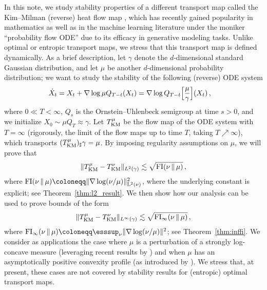 \documentclass[12pt]{article}
\newcommand{\1}{\mathds{1}}
\newcommand*{\defeq}{\coloneqq}
\newcommand{\mmid}{\,\Vert\,}
\newcommand{\deq}{\coloneqq}
\def\defeq{\coloneqq} %
\newcommand{\infFI}{\operatorname{FI}_\infty}
\theoremstyle{plain}
\theoremstyle{definition}
\theoremstyle{remark}
\begin{document}
In this note, we study stability properties of a different transport map called the Kim--Milman (reverse) heat flow map \cite{kim2012generalization}, which has recently gained popularity in {mathematics \cite{neeman2022lipschitz,klartag2023spectral,MikShe23HeatFlow,lopez2025bakry,BriPed25HeatFlow,fathi2024transportation,conforti2025coupling,serres2026contractive,ge2025generalization}} as well as in the machine learning literature under the moniker ``probability flow ODE'' \cite{Song+21SDE, Kim+24Consistency} due to its efficacy in generative modeling tasks. Unlike optimal or entropic transport maps, we stress that this transport map is defined dynamically. As a brief description, let $\gamma$ denote the $d$-dimensional standard Gaussian distribution, and let $\mu$ be another $d$-dimensional probability distribution; we want to study the stability of the following (reverse) ODE system 
\begin{align*}
    \dot{X}_t &= X_t + \nabla \log \mu Q_{T-t}(X_t) = \nabla \log Q_{T-t}\Bigl[\frac{\mu}{\gamma}\Bigr](X_t)\,,
\end{align*}
where $0 \ll T < \infty$, $Q_{s}$ is the Ornstein--Uhlenbeck semigroup at time $s > 0$, and we initialize $X_0 \sim \mu Q_T \approx \gamma$. Let $T_{\rm KM}^\mu$ be the flow map of the ODE system with $T = \infty$ (rigorously, the limit of the flow maps up to time $T$, taking $T \nearrow \infty$), which transports $(T_{\rm KM}^\mu)_\sharp\gamma = \mu$. By imposing regularity assumptions on $\mu$, we will prove that 
\begin{align}\label{eq:result_intro}
\|T^{\mu}_{\rm KM} - T_{\rm KM}^{\nu}\|_{L^2(\gamma)} \lesssim \sqrt{\rm{FI}(\nu\mmid \mu)}\,,
\end{align}
where $\rm{FI}(\nu\mmid\mu) \deq \|\nabla\log(\nu/\mu) \|^2_{L^2(\nu)}$, where the underlying constant is explicit{; see Theorem~\ref{thm:l2_result}}. We then show how our analysis can be used to prove bounds of the form
\begin{align}\label{eq:result_intro_2}
\|T^{\mu}_{\rm KM} - T_{\rm KM}^{\nu}\|_{L^\infty(\gamma)}\lesssim \sqrt{\infFI(\nu\mmid \mu)}\,,
\end{align}
where $\infFI(\nu\mmid\mu) \defeq \esssup_\nu \|\nabla \log(\nu/\mu)\|^2${; see Theorem~\ref{thm:inffi}}. We consider as applications the case where $\mu$ is a perturbation of a strongly log-concave measure (leveraging recent results by \cite{BriPed25HeatFlow, wibisono2025mixing}) and when $\mu$ has an asymptotically positive convexity profile (as introduced by \cite{conforti2024weak}). We stress that, at present, these cases are not covered by stability results for (entropic) optimal transport maps. 
\end{document}
